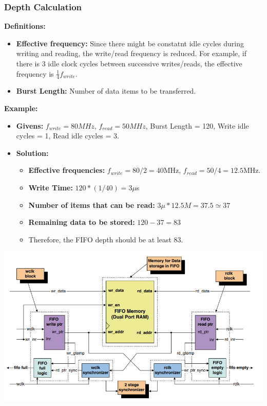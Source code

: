 \documentclass[11pt]{article}
\begin{document}
\subsubsection*{Depth Calculation}
\textbf{Definitions:} 
\begin{itemize}
    \item \textbf{Effective frequency:} Since there might be constatnt idle cycles during writing and reading, the write/read frequency is reduced. For example, if there is 3 idle clock cycles between successive writes/reads, the effective frequency is $\frac{1}{4}f_{write}$.
    \item \textbf{Burst Length:} Number of data items to be transferred.
\end{itemize}
\textbf{Example:}
\begin{itemize}
    \item \textbf{Givens:} $f_{write}=80MHz$, $f_{read}=50MHz$, Burst Length = 120, Write idle cycles = 1, Read idle cycles = 3.
    \item \textbf{Solution:}
        \begin{itemize}
            \item \textbf{Effective frequencies:} $f_{write}=80/2=40$MHz, $f_{read}=50/4 = 12.5$MHz.
            \item \textbf{Write Time:} $120 * (1/40)=3\mu$s
            \item \textbf{Number of items that can be read:} $3\mu *12.5M=37.5\simeq 37$
            \item \textbf{Remaining data to be stored:} $120-37=83$
            \item Therefore, the FIFO depth should be at least 83.
        \end{itemize}
\end{itemize}

\begin{center}
    \includegraphics[scale=0.7]{5.png}
\end{center}
\end{document}
